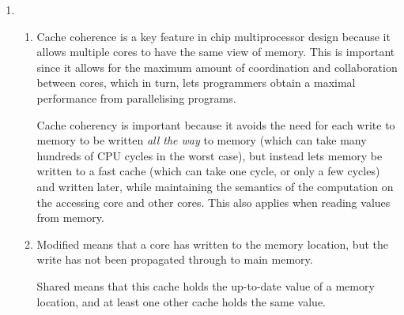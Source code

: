 \documentclass{report}
\begin{document}
\begin{enumerate}
\item
  \begin{enumerate}
  \item Cache coherence is a key feature in chip multiprocessor design
    because it allows multiple cores to have the same view of
    memory. This is important since it allows for the maximum amount
    of coordination and collaboration between cores, which in turn,
    lets programmers obtain a maximal performance from parallelising
    programs.

    Cache coherency is important because it avoids the need for each
    write to memory to be written \textit{all the way} to memory
    (which can take many hundreds of CPU cycles in the worst case),
    but instead lets memory be written to a fast cache (which can take
    one cycle, or only a few cycles) and written later, while
    maintaining the semantics of the computation on the accessing core
    and other cores. This also applies when reading values from
    memory.
  \item Modified means that a core has written to the memory location,
    but the write has not been propagated through to main memory.

    Shared means that this cache holds the up-to-date value of a
    memory location, and at least one other cache holds the same
    value.


\end{enumerate}
\end{enumerate}
\end{document}
